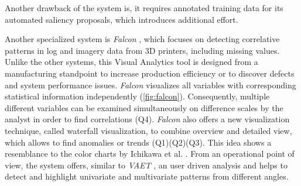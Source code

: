 \documentclass[electronic]{vgtc}             %
\begin{document}
Another drawback of the system is, it requires annotated training data for its automated saliency proposals, which introduces additional effort.

Another specialized system is \textit{Falcon}  \cite{steed:2017}, which focuses on detecting correlative patterns in log and imagery data from 3D printers, including missing values.
Unlike the other systems, this Visual Analytics tool is designed from a manufacturing standpoint to increase production efficiency or to discover defects and system performance issues.
\textit{Falcon}  visualizes all variables with corresponding statistical information independently (\autoref{fig:falcon}). 
Consequently, multiple different variables can be examined simultaneously  on difference scales by the analyst in order to find correlations (Q4).
\textit{Falcon}  also offers a new visualization technique, called waterfall visualization, to combine overview and detailed view, which allows to find anomalies or trends (Q1)(Q2)(Q3). 
This idea shows a resemblance to the color charts by Ichikawa et al. \cite{ichikawa:2002}.
From an operational point of view, the system offers, similar to \textit{VAET} \cite{Xie:2014}, an user driven analysis and helps to detect and highlight univariate and multivariate patterns from different angles.
\end{document}
